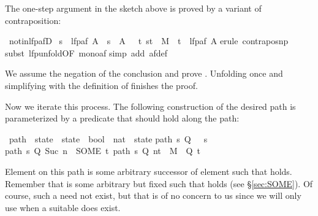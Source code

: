 \begin{isabellebody}
\begin{isamarkuptext}
The one-step argument in the sketch above
is proved by a variant of contraposition:%
\end{isamarkuptext}%
\isamarkuptrue%
\isamarkupfalse%
\ not{\isacharunderscore}in{\isacharunderscore}lfp{\isacharunderscore}afD{\isacharcolon}\isanewline
\ {\isachardoublequoteopen}s\ {\isasymnotin}\ lfp{\isacharparenleft}af\ A{\isacharparenright}\ {\isasymLongrightarrow}\ s\ {\isasymnotin}\ A\ {\isasymand}\ {\isacharparenleft}{\isasymexists}\ t{\isachardot}\ {\isacharparenleft}s{\isacharcomma}t{\isacharparenright}\ {\isasymin}\ M\ {\isasymand}\ t\ {\isasymnotin}\ lfp{\isacharparenleft}af\ A{\isacharparenright}{\isacharparenright}{\isachardoublequoteclose}\isanewline
%
\isadelimproof
%
\endisadelimproof
%
\isatagproof
{}\isamarkupfalse%
{\isacharparenleft}erule\ contrapos{\isacharunderscore}np{\isacharparenright}\isanewline
{}\isamarkupfalse%
{\isacharparenleft}subst\ lfp{\isacharunderscore}unfold{\isacharbrackleft}OF\ mono{\isacharunderscore}af{\isacharbrackright}{\isacharparenright}\isanewline
{}\isamarkupfalse%
{\isacharparenleft}simp\ add{\isacharcolon}\ af{\isacharunderscore}def{\isacharparenright}\isanewline
{}\isamarkupfalse%
%
\endisatagproof
{\isafoldproof}%
%
\isadelimproof
%
\endisadelimproof
%
\begin{isamarkuptext}%
\noindent
We assume the negation of the conclusion and prove .
Unfolding  once and
simplifying with the definition of  finishes the proof.

Now we iterate this process. The following construction of the desired
path is parameterized by a predicate  that should hold along the path:%
\end{isamarkuptext}%
\isamarkuptrue%
\isamarkupfalse%
\ path\ {\isacharcolon}{\isacharcolon}\ {\isachardoublequoteopen}state\ {\isasymRightarrow}\ {\isacharparenleft}state\ {\isasymRightarrow}\ bool{\isacharparenright}\ {\isasymRightarrow}\ {\isacharparenleft}nat\ {\isasymRightarrow}\ state{\isacharparenright}{\isachardoublequoteclose}\isanewline
{}\isamarkupfalse%
\isanewline
{\isachardoublequoteopen}path\ s\ Q\ {}\ {\isacharequal}\ s{\isachardoublequoteclose}\isanewline
{\isachardoublequoteopen}path\ s\ Q\ {\isacharparenleft}Suc\ n{\isacharparenright}\ {\isacharequal}\ {\isacharparenleft}SOME\ t{\isachardot}\ {\isacharparenleft}path\ s\ Q\ n{\isacharcomma}t{\isacharparenright}\ {\isasymin}\ M\ {\isasymand}\ Q\ t{\isacharparenright}{\isachardoublequoteclose}%
\begin{isamarkuptext}%
\noindent
Element  on this path is some arbitrary successor
 of element  such that  holds.  Remember that 
is some arbitrary but fixed  such that  holds (see \S\ref{sec:SOME}). Of
course, such a  need not exist, but that is of no
concern to us since we will only use  when a
suitable  does exist.


\end{isamarkuptext}
\end{isabellebody}
